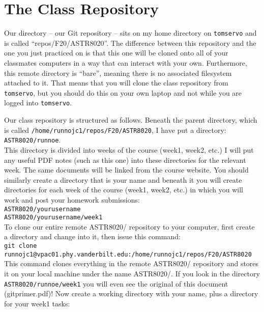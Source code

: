 \documentclass[12pt, letterpaper]{article}
\newcommand{\code}{\texttt}
\begin{document}
\section*{The Class Repository}
Our directory -- our Git repository -- sits on my home directory on \code{tomservo} and is called ``repos/F20/ASTR8020''.  The difference between this repository and the one you just practiced on is that this one will be cloned onto all of your classmates computers in a way that can interact with your own.  Furthermore, this remote directory is ``bare'', meaning there is no associated filesystem attached to it.  That means that you will clone the class repository from \code{tomservo}, but you should do this on your own laptop and not while you are logged into \code{tomservo}.

Our class repository is structured as follows.  Beneath the parent directory, which is called \code{/home/runnojc1/repos/F20/ASTR8020}, I have put a directory: \\

\code{ASTR8020/runnoe}. \\

This directory is divided into weeks of the course (week1, week2, etc.)  I will put any useful PDF notes (such as this one) into these directories for the relevant week.  The same documents will be linked from the course website.  You should similarly create a directory that is your name and beneath it you will create directories for each week of the course (week1, week2, etc.) in which you will work and post your homework submissions: \\

\noindent \code{ASTR8020/yourusername} \\
\code{ASTR8020/yourusername/week1} \\

To clone our entire remote ASTR8020/ repository to your computer, first create a directory and change into it, then issue this command: \\

\noindent\code{git clone runnojc1@vpac01.phy.vanderbilt.edu:/home/runnojc1/repos/F20/ASTR8020} \\

This command clones everything in the remote ASTR8020/ repository and stores it on your local machine under the name ASTR8020/.  If you look in the directory \code{ASTR8020/runnoe/week1} you will even see the original of this document (gitprimer.pdf)!  Now create a working directory with your name, plus a directory for your week1 tasks:
\end{document}

